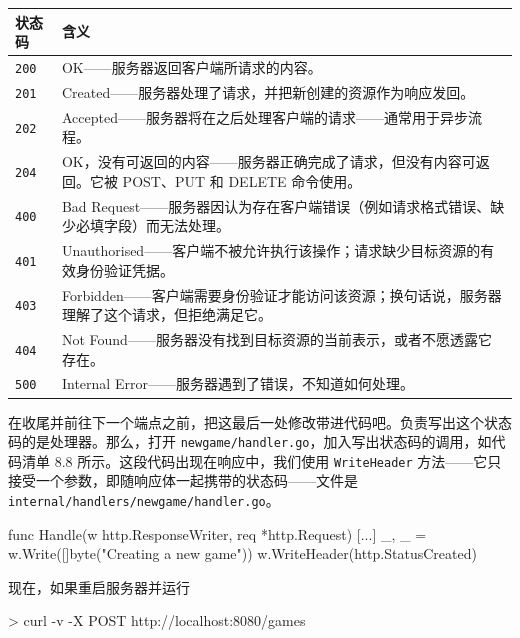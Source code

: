 \begin{center}
\small
\begin{tabularx}{\textwidth}{|l|X|}
\hline
\textbf{状态码} & \textbf{含义} \\
\hline
\texttt{200} & OK——服务器返回客户端所请求的内容。 \\
\hline
\texttt{201} & Created——服务器处理了请求，并把新创建的资源作为响应发回。 \\
\hline
\texttt{202} & Accepted——服务器将在之后处理客户端的请求——通常用于异步流程。 \\
\hline
\texttt{204} & OK，没有可返回的内容——服务器正确完成了请求，但没有内容可返回。它被 POST、PUT 和 DELETE 命令使用。 \\
\hline
\texttt{400} & Bad Request——服务器因认为存在客户端错误（例如请求格式错误、缺少必填字段）而无法处理。 \\
\hline
\texttt{401} & Unauthorised——客户端不被允许执行该操作；请求缺少目标资源的有效身份验证凭据。 \\
\hline
\texttt{403} & Forbidden——客户端需要身份验证才能访问该资源；换句话说，服务器理解了这个请求，但拒绝满足它。 \\
\hline
\texttt{404} & Not Found——服务器没有找到目标资源的当前表示，或者不愿透露它存在。 \\
\hline
\texttt{500} & Internal Error——服务器遇到了错误，不知道如何处理。 \\
\hline
\end{tabularx}
\end{center}

在收尾并前往下一个端点之前，把这最后一处修改带进代码吧。负责写出这个状态码的是处理器。那么，打开 \texttt{newgame/handler.go}，加入写出状态码的调用，如代码清单 8.8 所示。这段代码出现在响应中，我们使用 \texttt{WriteHeader} 方法——它只接受一个参数，即随响应体一起携带的状态码——文件是 \texttt{internal/handlers/newgame/handler.go}。

\begin{gocode}[title={代码清单 8.8 \texttt{handler.go}：设置成功响应的状态码}]
func Handle(w http.ResponseWriter, req *http.Request) {
    [...]
    _, _ = w.Write([]byte("Creating a new game"))
    w.WriteHeader(http.StatusCreated)
}
\end{gocode}

现在，如果重启服务器并运行

\begin{shellcode}[]
> curl -v -X POST http://localhost:8080/games
\end{shellcode}

